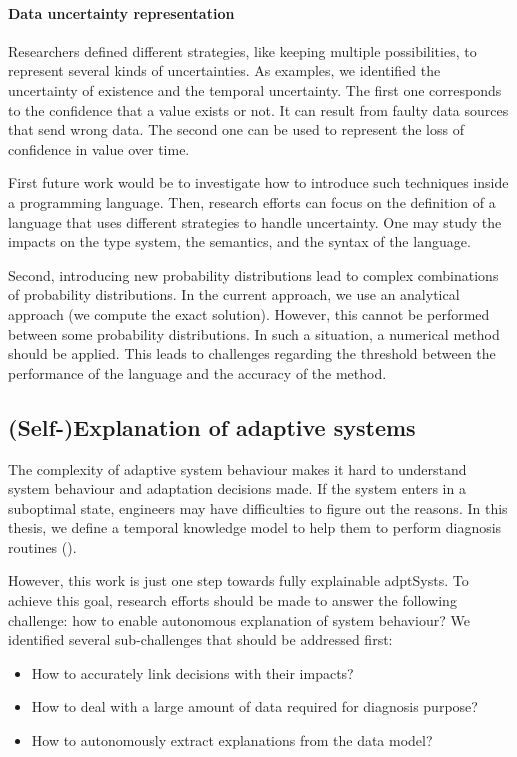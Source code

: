 \paragraph{Data uncertainty representation}
Researchers defined different strategies, like keeping multiple possibilities, to represent several kinds of uncertainties.
As examples, we identified the uncertainty of existence and the temporal uncertainty.
The first one corresponds to the confidence that a value exists or not.
It can result from faulty data sources that send wrong data.
The second one can be used to represent the loss of confidence in value over time.

First future work would be to investigate how to introduce such techniques inside a programming language.
Then, research efforts can focus on the definition of a language that uses different strategies to handle uncertainty.
One may study the impacts on the type system, the semantics, and the syntax of the language.

Second, introducing new probability distributions lead to complex combinations of probability distributions.
In the current approach, we use an analytical approach (we compute the exact solution).
However, this cannot be performed between some probability distributions.
In such a situation, a numerical method should be applied.
This leads to challenges regarding the threshold between the performance of the language and the accuracy of the method.

\subsection{(Self-)Explanation of adaptive systems}

The complexity of adaptive system behaviour makes it hard to understand system behaviour and adaptation decisions made.
If the system enters in a suboptimal state, engineers may have difficulties to figure out the reasons.
In this thesis, we define a  temporal knowledge model to help them to perform diagnosis routines (\cf {}).

However, this work is just one step towards fully explainable \glspl{adptSyst}.
To achieve this goal, research efforts should be made to answer the following challenge: how to enable autonomous explanation of system behaviour?
We identified several sub-challenges that should be addressed first:
\begin{itemize}
	\item How to accurately link decisions with their impacts?
	\item How to deal with a large amount of data required for diagnosis purpose?
	\item How to autonomously extract explanations from the data model?
\end{itemize}

